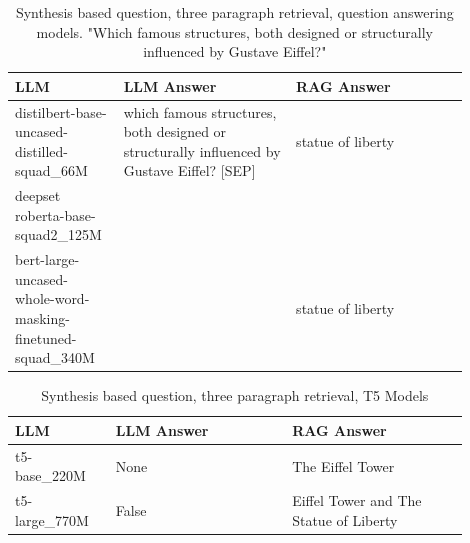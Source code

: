 \documentclass{wseas}
\begin{document}
\begin{table}[htbp]
  \centering
  \caption{Synthesis based question, three paragraph retrieval, question answering models. "Which famous structures, both designed or structurally influenced by Gustave Eiffel?"} %
  \label{tab:experiment_R_3_paragraph_Q_synthesis_M_QaModels_table}  %
  \begin{tabular}{|p{0.20\linewidth}|p{0.35\linewidth}|p{0.35\linewidth}|}
    \hline
    \textbf{LLM} & \textbf{LLM Answer} & \textbf{RAG Answer} \\
    \hline
    \makecell[lc]{distilbert-base-uncased-\\distilled-squad\_66M} & which famous structures, both designed or structurally influenced by Gustave Eiffel? {[}SEP{]} & statue of liberty \\
    \hline
    \makecell[l]{deepset roberta-base-\\squad2\_125M} & & \\
    \hline
    \makecell[l]{bert-large-uncased-\\whole-word-masking-\\finetuned-squad\_340M} & & statue of liberty \\
    \hline
  \end{tabular}
\end{table}
\begin{table}[htbp]
  \centering
  \caption{Synthesis based question, three paragraph retrieval, T5 Models} %
  \label{tab:experiment_R_3_paragraph_Q_synthesis_M_T5Models_table}  %
  \begin{tabular}{|p{0.20\linewidth}|p{0.35\linewidth}|p{0.35\linewidth}|}
    \hline
    \textbf{LLM} & \textbf{LLM Answer} & \textbf{RAG Answer} \\
    \hline
    t5-base\_220M & None & The Eiffel Tower \\
    \hline
    t5-large\_770M & False & Eiffel Tower and The Statue of Liberty \\
    \hline
  \end{tabular}
\end{table}
\end{document}
